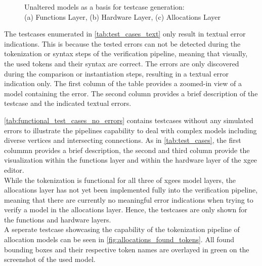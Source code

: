 \begin{figure}[htb]
\begin{minipage}{0.32\textwidth}
        \label{fig:allocations_unaltered}
    \end{minipage}
    \caption{Unaltered models as a basis for testcase generation:\\
    (a) Functions Layer, (b) Hardware Layer, (c) Allocations Layer}
    \label{fig:unaltered_layers}
\end{figure}

The testcases enumerated in \autoref{tab:test_cases_text} only result in textual error indications. This is because the tested errors can not be detected during the tokenization or syntax steps of the verification pipeline, meaning that visually, the used tokens and their syntax are correct. The errors are only discovered during the comparison or instantiation steps, resulting in a textual error indication only. The first column of the table provides a zoomed-in view of a model containing the error. The second column provides a brief description of the testcase and the indicated textual errors.

\autoref{tab:functional_test_cases_no_errors} contains testcases without any simulated errors to illustrate the pipelines capability to deal with complex models including diverse vertices and intersecting connections. As in \autoref{tab:test_cases}, the first colummn provides a brief description, the second and third column provide the visualization within the functions layer and within the hardware layer of the \acrshort{xgee} editor.\\
While the tokenization is functional for all three of \acrshort{xgee}s model layers, the allocations layer has not yet been implemented fully into the verification pipeline, meaning that there are currently no meaningful error indications when trying to verify a model in the allocations layer. Hence, the testcases are only shown for the functions and hardware layers.\\
A seperate testcase showcasing the capability of the tokenization pipeline of allocation models can be seen in \autoref{fig:allocations_found_tokens}. All found bounding boxes and their respective token names are overlayed in green on the screenshot of the used model.

